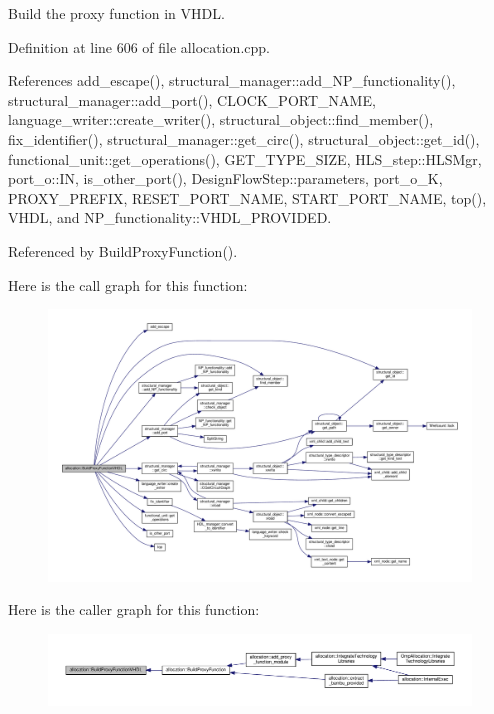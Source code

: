 Build the proxy function in V\+H\+DL. 



Definition at line 606 of file allocation.\+cpp.



References add\+\_\+escape(), structural\+\_\+manager\+::add\+\_\+\+N\+P\+\_\+functionality(), structural\+\_\+manager\+::add\+\_\+port(), C\+L\+O\+C\+K\+\_\+\+P\+O\+R\+T\+\_\+\+N\+A\+ME, language\+\_\+writer\+::create\+\_\+writer(), structural\+\_\+object\+::find\+\_\+member(), fix\+\_\+identifier(), structural\+\_\+manager\+::get\+\_\+circ(), structural\+\_\+object\+::get\+\_\+id(), functional\+\_\+unit\+::get\+\_\+operations(), G\+E\+T\+\_\+\+T\+Y\+P\+E\+\_\+\+S\+I\+ZE, H\+L\+S\+\_\+step\+::\+H\+L\+S\+Mgr, port\+\_\+o\+::\+IN, is\+\_\+other\+\_\+port(), Design\+Flow\+Step\+::parameters, port\+\_\+o\+\_\+K, P\+R\+O\+X\+Y\+\_\+\+P\+R\+E\+F\+IX, R\+E\+S\+E\+T\+\_\+\+P\+O\+R\+T\+\_\+\+N\+A\+ME, S\+T\+A\+R\+T\+\_\+\+P\+O\+R\+T\+\_\+\+N\+A\+ME, top(), V\+H\+DL, and N\+P\+\_\+functionality\+::\+V\+H\+D\+L\+\_\+\+P\+R\+O\+V\+I\+D\+ED.



Referenced by Build\+Proxy\+Function().

Here is the call graph for this function\+:
\nopagebreak
\begin{figure}[H]
\begin{center}
\leavevmode
\includegraphics[width=350pt]{d0/d74/classallocation_ab924181104812480fb5f27f23599487c_cgraph}
\end{center}
\end{figure}
Here is the caller graph for this function\+:
\nopagebreak
\begin{figure}[H]
\begin{center}
\leavevmode
\includegraphics[width=350pt]{d0/d74/classallocation_ab924181104812480fb5f27f23599487c_icgraph}
\end{center}
\end{figure}
\mbox{\label{classallocation_a6a0e21dd875ccd2320ec1c3032bd53c1}} 
